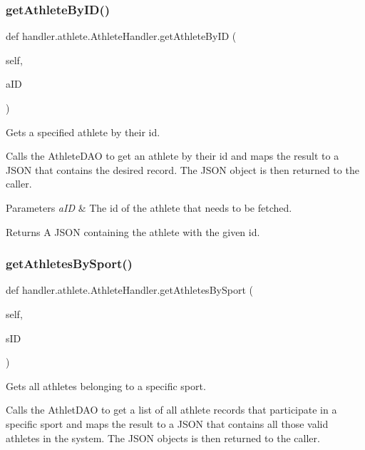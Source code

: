 \subsubsection{\texorpdfstring{get\+Athlete\+By\+I\+D()}{getAthleteByID()}}
{\footnotesize\ttfamily def handler.\+athlete.\+Athlete\+Handler.\+get\+Athlete\+By\+ID (\begin{DoxyParamCaption}\item[{}]{self,  }\item[{}]{a\+ID }\end{DoxyParamCaption})}



Gets a specified athlete by their id. 

Calls the Athlete\+D\+AO to get an athlete by their id and maps the result to a J\+S\+ON that contains the desired record. The J\+S\+ON object is then returned to the caller.


\begin{DoxyParams}{Parameters}
{\em a\+ID} & The id of the athlete that needs to be fetched.\\
\hline
\end{DoxyParams}
\begin{DoxyReturn}{Returns}
A J\+S\+ON containing the athlete with the given id. 
\end{DoxyReturn}
\mbox{\label{classhandler_1_1athlete_1_1_athlete_handler_af33bd416854d51f10a33aa264f1e3b2f}} 
\subsubsection{\texorpdfstring{get\+Athletes\+By\+Sport()}{getAthletesBySport()}}
{\footnotesize\ttfamily def handler.\+athlete.\+Athlete\+Handler.\+get\+Athletes\+By\+Sport (\begin{DoxyParamCaption}\item[{}]{self,  }\item[{}]{s\+ID }\end{DoxyParamCaption})}



Gets all athletes belonging to a specific sport. 

Calls the Athlet\+D\+AO to get a list of all athlete records that participate in a specific sport and maps the result to a J\+S\+ON that contains all those valid athletes in the system. The J\+S\+ON objects is then returned to the caller.


